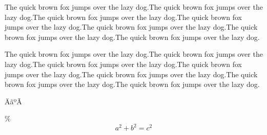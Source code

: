 \documentclass{article} %
\begin{document}
The quick brown fox jumps over the lazy dog.The quick brown fox jumps over the lazy dog.The quick brown fox jumps over the lazy dog.The quick brown fox jumps over the lazy dog.The quick brown fox jumps over the lazy dog.The quick brown fox jumps over the lazy dog.The quick brown fox jumps over the lazy dog.

The quick brown fox jumps over the lazy dog.The quick brown fox jumps over the lazy dog.The quick brown fox jumps over the lazy dog.The quick brown fox jumps over the lazy dog.The quick brown fox jumps over the lazy dog.The quick brown fox jumps over the lazy dog.The quick brown fox jumps over the lazy dog.

ÄãºÃ

\% %
$$a^2+b^2=c^2$$ %
\end{document}

